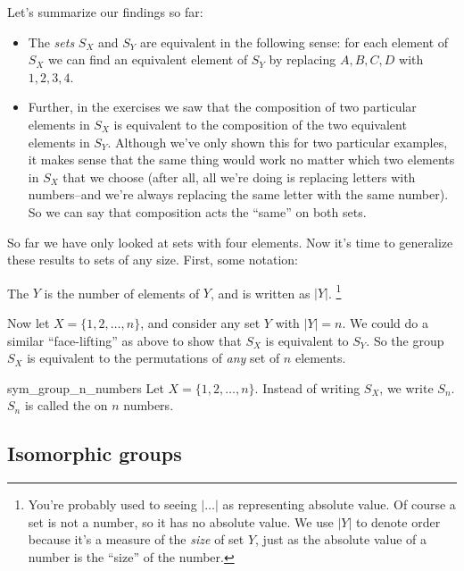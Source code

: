 Let's summarize our findings so far:
\begin{itemize}
\item
The \emph{sets} $S_X$ and $S_Y$ are equivalent in the following sense: for each element of $S_X$ we can find an equivalent element of $S_Y$ by replacing $A, B, C, D$ with $1, 2, 3, 4$.  

\item
Further, in the exercises we saw that  the composition of two particular elements in $S_X$ is equivalent to the composition of the two equivalent elements in $S_Y$. 
Although we've only shown this for two particular examples, it makes sense that the same thing would work no matter which two elements in $S_X$ that we choose (after all, all we're doing is replacing letters with numbers--and we're always replacing the same letter with the same number).   So we can say that composition acts the ``same'' on both sets.
\end{itemize}


So far we have only looked at sets with four elements. Now it's time to generalize these results to sets of any size. First, some notation:

\begin{notation}{}
The  $Y$ is the number of elements of $Y$, and is written as $|Y|$.
\footnote{ You're probably used to seeing $|\ldots|$ as representing absolute value. Of course a set is not a number, so it has no absolute value. We use $|Y|$ to denote order because it's a measure of the \emph{size} of set $Y$, just as the absolute value of a number is the ``size'' of the number.}
\end{notation}

Now let $X = \{1,2,\ldots, n\}$, and  consider any set $Y$ with $|Y| = n$. We could do a similar ``face-lifting'' as above to show that  $S_X$ is equivalent to $S_Y$.  So the group $S_X$ is equivalent to the permutations of \emph{any} set of $n$ elements.

\begin{notation}{sym_group_n_numbers}
Let $X=\{ 1, 2, \ldots, n\}$. Instead of writing $S_X$, we write $S_n$\label{symmetricgroup}.  $S_n$ is called the  on $n$ numbers.
\end{notation}

\subsection{Isomorphic groups}\label{sec:IsoGps}

